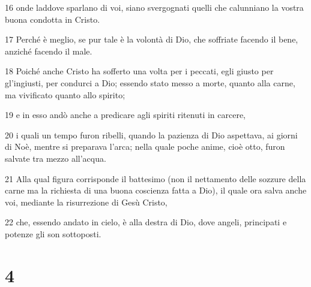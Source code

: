 \par 16 onde laddove sparlano di voi, siano svergognati quelli che calunniano la vostra buona condotta in Cristo.
\par 17 Perché è meglio, se pur tale è la volontà di Dio, che soffriate facendo il bene, anziché facendo il male.
\par 18 Poiché anche Cristo ha sofferto una volta per i peccati, egli giusto per gl'ingiusti, per condurci a Dio; essendo stato messo a morte, quanto alla carne, ma vivificato quanto allo spirito;
\par 19 e in esso andò anche a predicare agli spiriti ritenuti in carcere,
\par 20 i quali un tempo furon ribelli, quando la pazienza di Dio aspettava, ai giorni di Noè, mentre si preparava l'arca; nella quale poche anime, cioè otto, furon salvate tra mezzo all'acqua.
\par 21 Alla qual figura corrisponde il battesimo (non il nettamento delle sozzure della carne ma la richiesta di una buona coscienza fatta a Dio), il quale ora salva anche voi, mediante la risurrezione di Gesù Cristo,
\par 22 che, essendo andato in cielo, è alla destra di Dio, dove angeli, principati e potenze gli son sottoposti.

\chapter{4}

